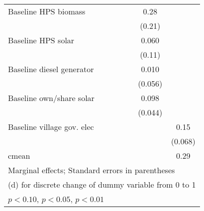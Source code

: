 \begin{table}[htbp]
\begin{tabular*}{1\hsize}{@{\hskip\tabcolsep\extracolsep\fill}l*{6}{c}}
Baseline HPS biomass&                  &                  &                  &                  &     0.28         &                  \\
                &                  &                  &                  &                  &   (0.21)         &                  \\
Baseline HPS solar&                  &                  &                  &                  &    0.060         &                  \\
                &                  &                  &                  &                  &   (0.11)         &                  \\
Baseline diesel generator&                  &                  &                  &                  &    0.010         &                  \\
                &                  &                  &                  &                  &  (0.056)         &                  \\
Baseline own/share solar&                  &                  &                  &                  &    0.098\sym{**} &                  \\
                &                  &                  &                  &                  &  (0.044)         &                  \\
Baseline village gov. elec&                  &                  &                  &                  &                  &     0.15\sym{**} \\
                &                  &                  &                  &                  &                  &  (0.068)         \\
\midrule
cmean           &                  &                  &                  &                  &                  &     0.29         \\
\bottomrule
\multicolumn{7}{l}{\footnotesize Marginal effects; Standard errors in parentheses}\\
\multicolumn{7}{l}{\footnotesize  (d) for discrete change of dummy variable from 0 to 1}\\
\multicolumn{7}{l}{\footnotesize \sym{*} \(p<0.10\), \sym{**} \(p<0.05\), \sym{***} \(p<0.01\)}\\
\end{tabular*}
\end{table}
